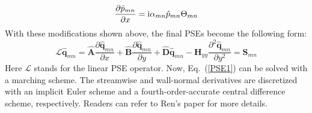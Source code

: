 \documentclass{AIAA}
\begin{document}
\begin{equation}
    \frac{\partial \tilde p_{mn}}{\partial x} = {\rm i}\alpha_{mn}\hat p_{mn}\Theta_{mn}
\end{equation}
With these modifications shown above, the final PSEs become the following form:
\begin{equation}
\label{PSE1}
    \mathscr{L}{\mathbf{\hat q}}_{mn}  = {\mathbf{\hat A}}\frac{{\partial {\mathbf{\hat q}}_{mn} }}
    {{\partial x}} + {\mathbf{\hat B}}\frac{{\partial {\mathbf{\hat q}}_{mn} }}
    {{\partial y}} + {\mathbf{\hat D\hat q}}_{mn}  - {\mathbf{H}}_{yy} \frac{{\partial ^2 {\mathbf{\hat q}}_{mn} }}
    {{\partial y^2 }} = {\mathbf{S}}_{mn}
\end{equation}
Here $\mathscr{L}$ stands for the linear PSE operator. Now, Eq.~(\ref{PSE1}) can be solved with a marching scheme. The streamwise and wall-normal derivatives are discretized with an implicit Euler scheme and a fourth-order-accurate central difference scheme, respectively. Readers can refer to Ren's paper\cite{Ren2014a,Ren2014b,Ren2014c,Ren2015,Ren2016} for more details.
\end{document}

